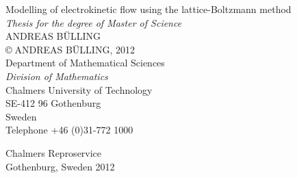 \newpage
\clearpage
\thispagestyle{empty}


\mbox{}
\vspace{75pt}

\noindent Modelling of electrokinetic flow using the lattice-Boltzmann
method\\
\emph{Thesis for the degree of Master of Science}\\
ANDREAS B\"{U}LLING\\

\noindent\copyright $\;$ANDREAS B\"{U}LLING, 2012\\

\noindent Department of Mathematical Sciences \\
         \emph{Division of Mathematics} \\
	Chalmers University of Technology \\
	SE-412 96 Gothenburg\\
 Sweden\\
Telephone +46 (0)31-772 1000

\vspace{370pt}

\noindent Chalmers Reproservice\\
Gothenburg, Sweden 2012
